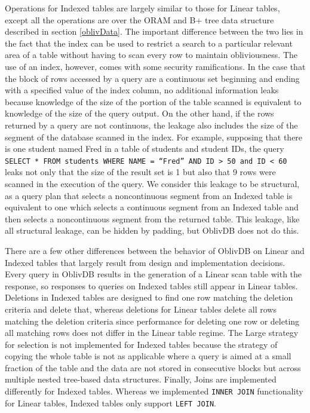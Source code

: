 \documentclass[USenglish,oneside,twocolumn]{article}
\def\name/{OblivDB}
\begin{document}
Operations for Indexed tables are largely similar to those for Linear tables, except all the operations are over the ORAM and B+ tree data structure described in section \ref{oblivData}. The important difference between the two lies in the fact that the index can be used to restrict a search to a particular relevant area of a table without having to scan every row to maintain obliviousness. The use of an index, however, comes with some security ramifications. In the case that the block of rows accessed by a query are a continuous set beginning and ending with a specified value of the index column, no additional information leaks because knowledge of the size of the portion of the table scanned is equivalent to knowledge of the size of the query output. On the other hand, if the rows returned by a query are not continuous, the leakage also includes the size of the segment of the database scanned in the index. For example, supposing that there is one student named Fred in a table of students and student IDs,  the query \texttt{SELECT * FROM students WHERE NAME = ``Fred'' AND ID > 50 and ID < 60} leaks not only that the size of the result set is 1 but also that 9 rows were scanned in the execution of the query. We consider this leakage to be structural, as a query plan that selects a noncontinuous segment from an Indexed table is equivalent to one which selects a continuous segment from an Indexed table and then selects a noncontinuous segment from the returned table. This leakage, like all structural leakage, can be hidden by padding, but \name/ does not do this. 

There are a few other differences between the behavior of \name/ on Linear and Indexed tables that largely result from design and implementation decisions. Every query in \name/ results in the generation of a Linear scan table with the response, so responses to queries on Indexed tables still appear in Linear tables. Deletions in Indexed tables are designed to find one row matching the deletion criteria and delete that, whereas deletions for Linear tables delete all rows matching the deletion criteria since performance for deleting one row or deleting all matching rows does not differ in the Linear table regime. The Large strategy for selection is not implemented for Indexed tables because the strategy of copying the whole table is not as applicable where a query is aimed at a small fraction of the table and the data are not stored in consecutive blocks but across multiple nested tree-based data structures. Finally, Joins are implemented differently for Indexed tables. Whereas we implemented \texttt{INNER JOIN} functionality for Linear tables, Indexed tables only support \texttt{LEFT JOIN}. 
\end{document}

